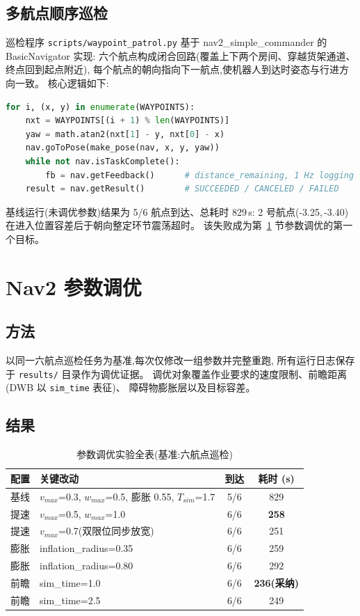 \documentclass[12pt, a4paper]{ctexart}
\begin{document}
\subsection{多航点顺序巡检}
巡检程序 \texttt{scripts/waypoint\_patrol.py} 基于
nav2\_simple\_commander 的 BasicNavigator 实现:
六个航点构成闭合回路(覆盖上下两个房间、穿越货架通道、终点回到起点附近),
每个航点的朝向指向下一航点,使机器人到达时姿态与行进方向一致。
核心逻辑如下:
\begin{lstlisting}[language=Python]
for i, (x, y) in enumerate(WAYPOINTS):
    nxt = WAYPOINTS[(i + 1) % len(WAYPOINTS)]
    yaw = math.atan2(nxt[1] - y, nxt[0] - x)
    nav.goToPose(make_pose(nav, x, y, yaw))
    while not nav.isTaskComplete():
        fb = nav.getFeedback()      # distance_remaining, 1 Hz logging
    result = nav.getResult()        # SUCCEEDED / CANCELED / FAILED
\end{lstlisting}
基线运行(未调优参数)结果为 5/6 航点到达、总耗时 829\,s:
2 号航点(-3.25,\,-3.40)在进入位置容差后于朝向整定环节震荡超时。
该失败成为第~\ref{sec:tuning} 节参数调优的第一个目标。

\section{Nav2 参数调优}\label{sec:tuning}

\subsection{方法}
以同一六航点巡检任务为基准,每次仅修改一组参数并完整重跑,
所有运行日志保存于 \texttt{results/} 目录作为调优证据。
调优对象覆盖作业要求的速度限制、前瞻距离(DWB 以 \texttt{sim\_time} 表征)、
障碍物膨胀层以及目标容差。

\subsection{结果}
\begin{table}[H]
\centering
\begin{tabular}{llcc}
\toprule
配置 & 关键改动 & 到达 & 耗时 (s) \\
\midrule
基线 & $v_{max}$=0.3, $w_{max}$=0.5, 膨胀 0.55, $T_{sim}$=1.7 & 5/6 & 829 \\
提速 & $v_{max}$=0.5, $w_{max}$=1.0 & 6/6 & \textbf{258} \\
提速 & $v_{max}$=0.7(双限位同步放宽) & 6/6 & 251 \\
膨胀 & inflation\_radius=0.35 & 6/6 & 259 \\
膨胀 & inflation\_radius=0.80 & 6/6 & 292 \\
前瞻 & sim\_time=1.0 & 6/6 & \textbf{236(采纳)} \\
前瞻 & sim\_time=2.5 & 6/6 & 249 \\
\bottomrule
\end{tabular}
\caption{参数调优实验全表(基准:六航点巡检)}
\label{tab:tuning}
\end{table}
\end{document}
